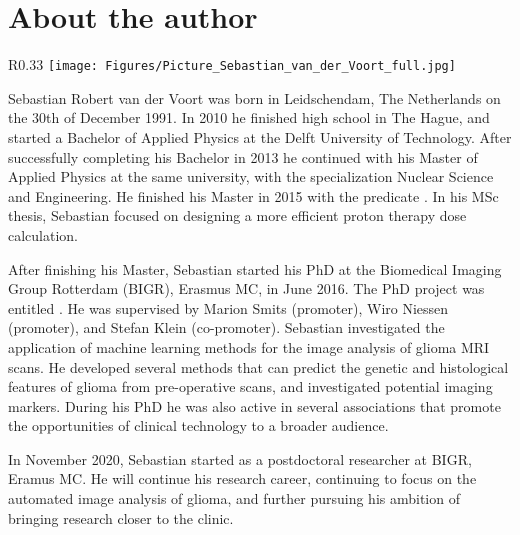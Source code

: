 \chapter{About the author}

\begin{wrapfigure}{R}{0.33\textwidth}
    \centering
    \texttt{[image: Figures/Picture\_Sebastian\_van\_der\_Voort\_full.jpg]}
\end{wrapfigure}


Sebastian Robert van der Voort was born in Leidschendam, The Netherlands on the 30th of December 1991.
In 2010 he finished high school in The Hague, and started a Bachelor of Applied Physics at the Delft University of Technology.
After successfully completing his Bachelor in 2013 he continued with his Master of Applied Physics at the same university, with the specialization Nuclear Science and Engineering.
He finished his Master in 2015 with the predicate .
In his MSc thesis, Sebastian focused on designing a more efficient proton therapy dose calculation.

\vspace{\baselineskip}
\noindent After finishing his Master, Sebastian started his PhD at the Biomedical Imaging Group Rotterdam (BIGR), Erasmus MC, in June 2016.
The PhD project was entitled .
He was supervised by Marion Smits (promoter), Wiro Niessen (promoter), and Stefan Klein (co-promoter).
Sebastian investigated the application of machine learning methods for the image analysis of glioma MRI scans.
He developed several methods that can predict the genetic and histological features of glioma from pre-operative scans, and investigated potential imaging markers.
During his PhD he was also active in several associations that promote the opportunities of clinical technology to a broader audience.

\vspace{\baselineskip}
\noindent In November 2020, Sebastian started as a postdoctoral researcher at BIGR, Eramus MC\@.
He will continue his research career, continuing to focus on the automated image analysis of glioma, and further pursuing his ambition of bringing research closer to the clinic.
